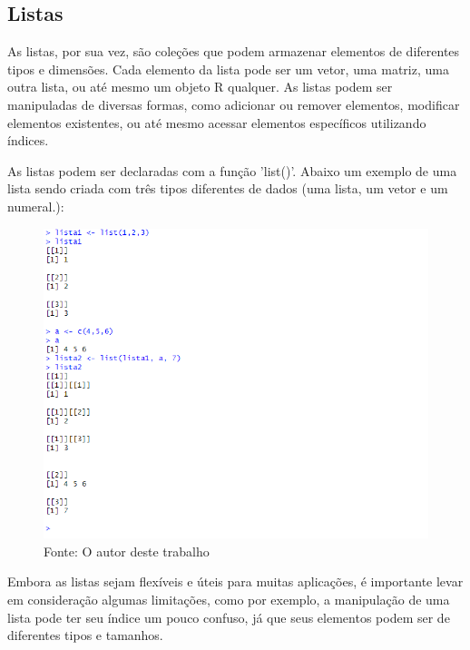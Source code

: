    \subsection{Listas}
    		As listas, por sua vez, são coleções que podem armazenar elementos de diferentes tipos e dimensões. Cada elemento da lista pode ser um vetor, uma matriz, uma outra lista, ou até mesmo um objeto R qualquer. As listas podem ser manipuladas de diversas formas, como adicionar ou remover elementos, modificar elementos existentes, ou até mesmo acessar elementos específicos utilizando índices.\par 
    		As listas podem ser declaradas com a função 'list()'. Abaixo um exemplo de uma lista sendo criada com três tipos diferentes de dados (uma lista, um vetor e um numeral.):\begin{figure}[H]
    			\centering
    			\caption{}
    			\includegraphics[width=1.0\linewidth]{Prints/screenshot004}
    			\label{fig:screenshot004}
    			{\tiny \sf Fonte: O autor deste trabalho }
    		\end{figure}
    		Embora as listas sejam flexíveis e úteis para muitas aplicações, é importante levar em consideração algumas limitações, como por exemplo, a manipulação de uma lista pode ter seu índice um pouco confuso, já que seus elementos podem ser de diferentes tipos e tamanhos.
